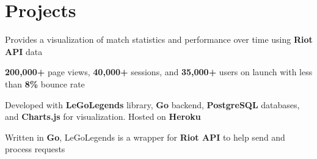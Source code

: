 \documentclass[]{peter_resume}
\begin{document}
\begin{minipage}{\textwidth}

\section{Projects}
\begin{comment}
\runsubsection{RaiseMyElo}
\location{\hfill\urlstyle{same}\url{http://raisemyelo.gg}}
\descript{League of Legends improvement service platform}
\begin{tightemize}
\item A platform to connect gamers for coaching and elo improvement services
\item Developed with \textbf{LeGoLegends} library, \textbf{Go} backend, \textbf{PostgreSQL} databases, and \textbf{Charts.js} for visualization. Hosted on \textbf{Heroku}
\end{tightemize} 
\sectionsep
\end{comment}

\begin{tightemize}
\item Provides a visualization of match statistics and performance over time using \textbf{Riot API} data
\item \textbf{200,000+} page views, \textbf{40,000+} sessions, and \textbf{35,000+} users on launch with less than \textbf{8\%} bounce rate
\item Developed with \textbf{LeGoLegends} library, \textbf{Go} backend, \textbf{PostgreSQL} databases, and \textbf{Charts.js} for visualization. Hosted on \textbf{Heroku}
\end{tightemize} 
\sectionsep

\location{}
\begin{tightemize}
\item Written in \textbf{Go}, LeGoLegends is a wrapper for \textbf{Riot API} to help send and process requests
\end{tightemize} 
\sectionsep

\vspace{0.1cm}





\end{minipage}
\end{document}
